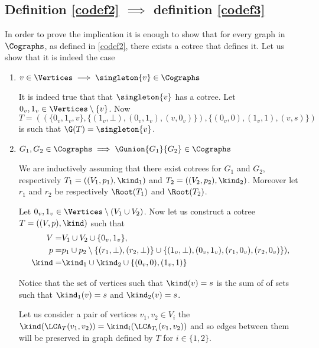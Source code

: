 \subsection{Definition \ref{codef2} $\implies$ definition \ref{codef3}}

In order to prove the implication it is enough to show that for every graph in $\Cographs$, as defined in \ref{codef2}, there exists a cotree that defines it. Let us show that it is indeed the case

\begin{enumerate}
    \item $v \in \Vertices \implies \singleton{v} \in \Cographs$

          It is indeed true that that $\singleton{v}$ has a cotree. Let $0_v, 1_v \in \Vertices \setminus \{v\}$. Now
          \[
              T = ((\{0_v,1_v,v\}, \{(1_v,\bot), (0_v,1_v),(v,0_v)\}), \{(0_v,0), (1_v,1), (v,s)\})
          \]
          is such that $\G(T) = \singleton{v}$.

    \item $G_1,G_2 \in \Cographs \implies \Gunion{G_1}{G_2} \in \Cographs$

          We are inductively assuming that there exist cotrees for $G_1$ and $G_2$, respectively $T_1 = ((V_1, p_1), \kind_1)$ and $T_2 = ((V_2, p_2), \kind_2)$. Moreover let $r_1$ and $r_2$ be respectively $\Root(T_1)$ and $\Root(T_2)$.

          Let $0_v, 1_v \in \Vertices \setminus (V_1 \cup V_2)$. Now let us construct a cotree $T = ((V, p), \kind)$ such that
          \[
              \begin{split}
                  V = & V_1\cup V_2 \cup \{0_v,1_v\}, \\
                  p = & p_1 \cup p_2 \setminus \{(r_1,\bot), (r_2, \bot)\} \cup \{(1_v, \bot), (0_v, 1_v), (r_1, 0_v), (r_2, 0_v)\}
                  ), \\
                  \kind = & \kind_1 \cup \kind_2 \cup \{(0_v,0), (1_v,1)\}
              \end{split}
          \]

          Notice that the set of vertices such that $\kind(v) = s$ is the sum of of sets such that $\kind_1(v) = s$ and $\kind_2(v) = s$.

          Let us consider a pair of vertices $v_1, v_2 \in V_i$ the $\kind(\LCA_T(v_1, v_2)) = \kind_{i}(\LCA_{T_{i}}(v_1, v_2))$ and so edges between them will be preserved in graph defined by $T$ for $i \in \{1,2\}$.


\end{enumerate}
